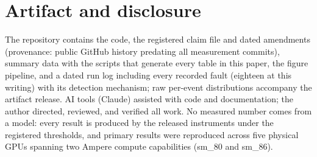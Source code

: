 \documentclass[11pt]{article}
\begin{document}
\section*{Artifact and disclosure}

The repository contains the code, the registered claim file and
dated amendments (provenance: public GitHub history predating all
measurement commits), summary data with the scripts that generate
every table in this paper, the figure pipeline, and a dated run log
including every recorded fault (eighteen at this writing) with its
detection mechanism; raw per-event distributions accompany the
artifact release. AI tools (Claude) assisted with code and
documentation; the author directed, reviewed, and verified all work.
No measured number comes from a model: every result is produced by
the released instruments under the registered thresholds, and
primary results were reproduced across five physical GPUs spanning
two Ampere compute capabilities (sm\_80 and sm\_86).
\end{document}
